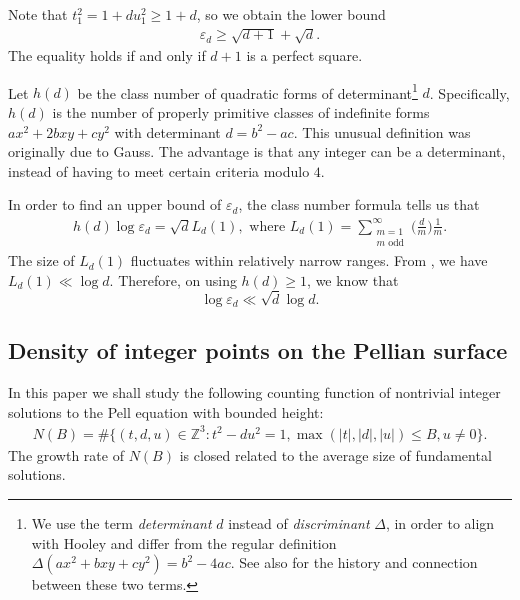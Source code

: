\documentclass[reqno, 11pt, twoside]{amsart}
\numberwithin{equation}{section}
\theoremstyle{definition}
\renewcommand{\leq}{\leqslant}
\renewcommand{\geq}{\geqslant}
\newcommand{\eps}{\varepsilon}
\newcommand{\ZZ}{\mathbb{Z}}
\begin{document}
Note that $t_1^2 = 1 + du_1^2 \geq 1 + d$, so we obtain the lower bound
\begin{eqnarray}\label{lower-bound}
	\eps_d \geq \sqrt{d+1} + \sqrt{d}.
\end{eqnarray}
The equality holds if and only if $d + 1$ is a perfect square.

Let $h(d)$ be the class number of quadratic forms of determinant\footnote{ We use the term \textit{determinant} $d$ instead of \textit{discriminant} $\Delta$, in order to align with Hooley \cite{Hoo} and differ from the regular definition $\Delta(ax^2 + bxy + cy^2) = b^2 - 4ac$. See also \cite[Chapter 1.3.D]{Cox} for the history and connection between these two terms.}  $d$. Specifically, $h(d)$ is the number of properly primitive classes of indefinite forms $ax^2 + 2bxy + cy^2$ with determinant $d = b^2 - ac$. This unusual definition was originally due to Gauss. The advantage is that any integer can be a determinant, instead of having to meet certain criteria modulo $4$.

In order to find an upper bound of $\eps_d$, the class number formula \cite[Formula (3)]{Hoo} tells us that
\begin{eqnarray}\label{cnf}
	h(d)\log \eps_d = \sqrt{d} L_d(1), \text{ where } L_d(1) = \sum_{\substack{m = 1 \\ m \text{ odd}}}^{\infty} \Big( \frac{d}{m} \Big) \frac{1}{m}.
\end{eqnarray}
The size of $L_d(1)$ fluctuates within relatively narrow ranges. From \cite[Equation (3.11)]{Bru}, we have $L_d(1) \ll \log d$. Therefore, on using $h(d) \geq 1$, we know that
\begin{equation}\label{fs-ub}
	\log \eps_d \ll  \sqrt{d} \log d.
\end{equation}



\subsection{Density of integer points on the Pellian surface}

In this paper we shall study the following counting function of nontrivial integer solutions to the Pell equation with bounded height:
\begin{align}\label{count-func}
 	N(B) = \#\{ (t,d,u) \in \ZZ^3: t^2 - du^2 = 1, \max (|t|, |d|, |u|) \leq B, u \neq 0 \}.
\end{align}
The growth rate of $N(B)$ is closed related to the average size of fundamental solutions.
\end{document}
